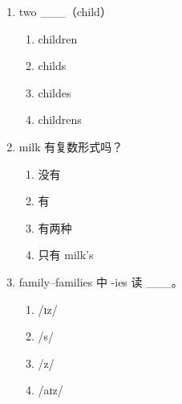 \documentclass[11pt,a4paper]{ctexart}
\begin{document}
\begin{enumerate}[leftmargin=*,itemsep=4pt]
\item two \_\_\_（child）
\begin{enumerate}[label=\Alph*.,leftmargin=2em,itemsep=1pt,topsep=2pt]
\item children
\item childs
\item childes
\item childrens
\end{enumerate}
\item milk 有复数形式吗？
\begin{enumerate}[label=\Alph*.,leftmargin=2em,itemsep=1pt,topsep=2pt]
\item 没有
\item 有
\item 有两种
\item 只有 milk’s
\end{enumerate}
\item family–families 中 -ies 读 \_\_\_。
\begin{enumerate}[label=\Alph*.,leftmargin=2em,itemsep=1pt,topsep=2pt]
\item /ɪz/
\item /s/
\item /z/
\item /aɪz/
\end{enumerate}
\end{enumerate}

\newpage
\end{document}
